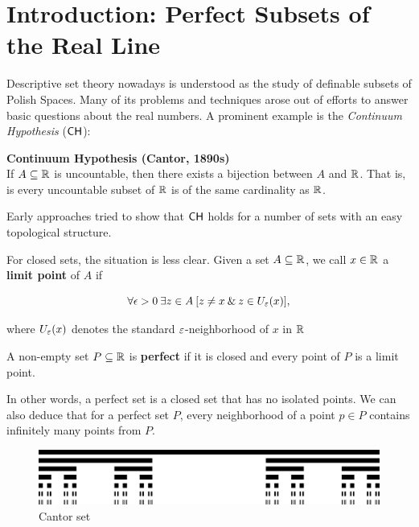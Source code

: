 \section{Introduction: Perfect Subsets of the Real Line}

Descriptive set theory nowadays is understood as the study of definable subsets of Polish Spaces. Many of its problems and techniques arose out of efforts to answer basic questions about the real numbers. A prominent example is the \textit{Continuum Hypothesis} ($\mathsf{CH}$):

\begin{framed}
\textbf{Continuum Hypothesis (Cantor, 1890s)}\\
If $A \subseteq \mathbb{R}$ is uncountable, then there exists a bijection between $A$ and $\mathbb{R}$. That is, is every uncountable subset of $\mathbb{R}$ is of the same cardinality as $\mathbb{R}$.
\end{framed}

Early approaches tried to show that $\mathsf{CH}$ holds for a number of sets with an easy topological structure.

For closed sets, the situation is less clear. Given a set $A \subseteq \mathbb{R}$, we call $x \in \mathbb{R}$ a \textbf{limit point} of $A$ if

\begin{equation}
\forall \epsilon > 0 \: \exists z \in A \: [z \neq x \: \& \: z \in U_\varepsilon(x)],
\end{equation}

where $U_\varepsilon(x)$ denotes the standard $\varepsilon$-neighborhood of $x$ in $\mathbb{R}$

\begin{definition}\label{def-perfect}A non-empty set $P \subseteq \mathbb{R}$ is \textbf{perfect} if it is closed and every point of $P$ is a limit point.

\end{definition}In other words, a perfect set is a closed set that has no isolated points. We can also deduce that for a perfect set $P$, every neighborhood of a point $p \in P$ contains infinitely many points from $P$.

\begin{figure}[!htbp]
\centering
\includegraphics[width=0.7\linewidth]{files/Cantor_set-7f15a3eb647d25cf38092c5cd78d7432.png}
\caption*{Cantor set}
\end{figure}

